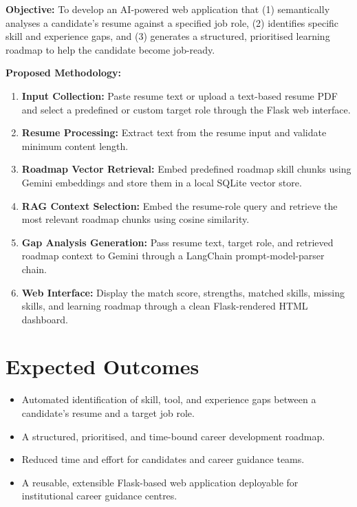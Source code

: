 \documentclass[12pt,a4paper]{report}
\begin{document}
\textbf{Objective:} To develop an AI-powered web application that (1)
semantically analyses a candidate's resume against a specified job role, (2)
identifies specific skill and experience gaps, and (3) generates a structured,
prioritised learning roadmap to help the candidate become job-ready.

\textbf{Proposed Methodology:}

\begin{enumerate}
  \item \textbf{Input Collection:}
        Paste resume text or upload a text-based resume PDF and select a
        predefined or custom target role through the Flask web interface.
  \item \textbf{Resume Processing:}
        Extract text from the resume input and validate minimum content length.
  \item \textbf{Roadmap Vector Retrieval:}
        Embed predefined roadmap skill chunks using Gemini embeddings and store
        them in a local SQLite vector store.
  \item \textbf{RAG Context Selection:}
        Embed the resume-role query and retrieve the most relevant roadmap chunks
        using cosine similarity.
  \item \textbf{Gap Analysis Generation:}
        Pass resume text, target role, and retrieved roadmap context to Gemini
        through a LangChain prompt-model-parser chain.
  \item \textbf{Web Interface:}
        Display the match score, strengths, matched skills, missing skills, and
        learning roadmap through a clean Flask-rendered HTML dashboard.
\end{enumerate}

\section{Expected Outcomes}

\begin{itemize}
  \item Automated identification of skill, tool, and experience gaps between a
        candidate's resume and a target job role.
  \item A structured, prioritised, and time-bound career development roadmap.
  \item Reduced time and effort for candidates and career guidance teams.
  \item A reusable, extensible Flask-based web application deployable for
        institutional career guidance centres.
\end{itemize}
\end{document}
